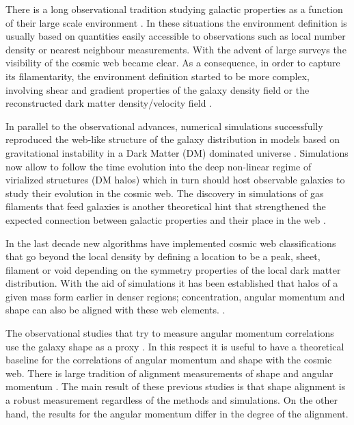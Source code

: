 \documentclass[useAMS,usenatbib]{mn2e}
\begin{document}
There is a long observational tradition studying galactic properties
as a function of their large scale environment
\citep[e.g.][]{Oemler1974,Dressler1980,Pimbblet2002,Gomez2003,Kauffmann2004,Abbas2006,Baldry2006,Park2007,OMill2008,Gonzalez2009,Padilla2010,Wilman2010,Muldrew2012}. In
these situations the environment definition is usually based on
quantities easily accessible to observations such as local number
density or nearest neighbour measurements. With
the advent of large surveys the visibility of the cosmic web became
clear. As a consequence, in order to capture its filamentarity, the
environment definition started to be more complex, involving shear and gradient 
properties of the galaxy density field or the reconstructed dark
matter density/velocity field
\citep[e.g.]{Lee2005,AragonCalvo2007,Hahn2007,Sousbie2008,Zhang2009,MunozCuartas2011,Vweb,Trowland2013,Tempel2014}. 

In parallel to the observational advances, numerical simulations
successfully reproduced the web-like structure of the galaxy
distribution in models based on gravitational instability in a Dark
Matter (DM) dominated universe
\citep[e.g.][]{Bond1996,Colberg2005}. Simulations now allow to follow
the time evolution into the deep non-linear regime of virialized
structures (DM halos) which in turn should host observable
galaxies to study their evolution in the cosmic web. The discovery in
simulations of gas filaments that feed galaxies is another theoretical
hint that strengthened the expected connection between galactic
properties and their place in the web \citep{Ocvirk2008,Dekel2009}.  


In the last decade new algorithms have implemented cosmic web
classifications that go beyond the local density by defining a
location to be a peak, sheet, filament or void depending on the
symmetry properties of the local dark matter distribution. With the
aid of simulations it has been established that halos of a given mass
form earlier in denser regions; concentration, angular momentum and shape can also
be aligned with these web elements. \citep[e.g][]{AragonCalvo2007,Hahn2007,Tweb,Zhang2009,Gonzalez2010,Noh2011,Codis2012,Libeskind2013,Trowland2013}.   

The observational studies that try to measure angular momentum correlations
use the galaxy shape as a proxy  \citep{Lee2002,Lee2007,Jones2010,Paz2008}. In
this respect it is useful to have a theoretical baseline for the
correlations of angular momentum and shape with the cosmic web.  There
is large tradition of alignment measurements of shape and angular momentum
\citep[e.g.][]{Hahn2007,AragonCalvo2007,Zhang2009,Paz2010,Codis2012,Trowland2013,Libeskind2013,AragonCalvo2014}. The
main result of these previous studies is that shape alignment is a
robust measurement regardless of the methods and simulations. On the
other hand, the results for the angular momentum differ in the degree
of the alignment.  
\end{document}
